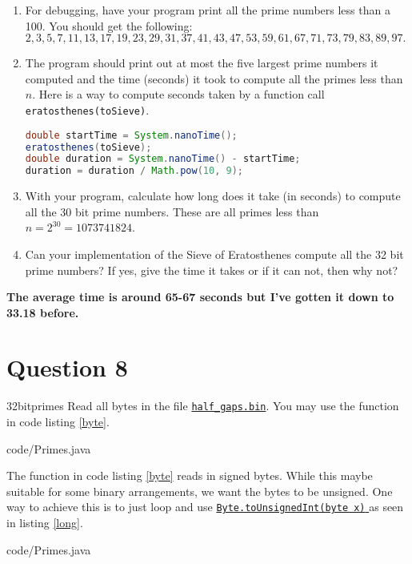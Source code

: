 \documentclass{article}
\newcommand\docs{\href{%
    https://tinyurl.com/25w2e4wy%
  }{%
    \texttt{Byte.toUnsignedInt(byte x)}%
  }%
}
\begin{document}
\begin{enumerate}
  \item For debugging, have your program print all the prime numbers less
        than a 100. You should get the following: $ 2, 3, 5, 7, 11, 13,
          17, 19, 23, 29, 31, 37, 41, 43, 47, 53, 59, 61, 67, 71, 73, 79,
          83, 89, 97. $
  \item The program should print out at most the five largest prime
        numbers it computed and the time (seconds) it took to compute all
        the primes less than $n$. Here is a way to compute seconds taken
        by a function call \texttt{eratosthenes(toSieve)}.

        \begin{lstlisting}[language=java]
double startTime = System.nanoTime();
eratosthenes(toSieve);
double duration = System.nanoTime() - startTime;
duration = duration / Math.pow(10, 9);
\end{lstlisting}

  \item With your program, calculate how long does it take (in seconds) to
        compute all the 30 bit prime numbers. These are all primes less
        than $n = 2^{30} = 1073741824$.

  \item Can your implementation of the Sieve of Eratosthenes compute all
        the 32 bit prime numbers? If yes, give the time it takes or if it
        can not, then why not? 
\end{enumerate}
\textbf{The average time is around 65-67 seconds but I've gotten it down to 33.18 before.}
\section {Question 8}{32bitprimes} Read all bytes in the file
\href{https://tinyurl.com/24bvsnaf}{\texttt{half\_gaps.bin}}. You may
use the function in code listing \ref{byte}.


{code/Primes.java}

The function in code listing \ref{byte} reads in signed bytes.
While this maybe suitable for some binary arrangements, we want
the bytes to be unsigned. One way to achieve this is to just loop
and use \docs{} as seen in listing \ref{long}.


{code/Primes.java}
\end{document}
